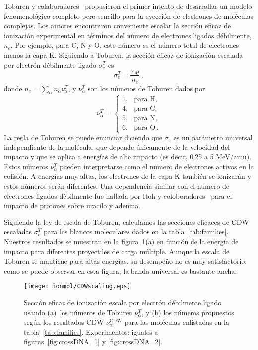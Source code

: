 Toburen y colaboradores~\cite{Toburen:75,Toburen:76} propusieron el 
primer intento de desarrollar un modelo fenomenológico completo pero 
sencillo para la eyección de electrones de moléculas complejas. Los 
autores encontraron conveniente escalar la sección eficaz de ionización 
experimental en términos del número de electrones ligados débilmente, $n_e$.
Por ejemplo, para C, N y O, este número es el número total de 
electrones menos la capa K. Siguiendo a Toburen, la sección eficaz de 
ionización escalada por electrón débilmente ligado $\sigma_{e}^T$ es
\begin{equation}
\sigma_{e}^T=\frac{\sigma_{M}}{n_e}\,, 
\label{27} 
\end{equation}
donde $n_e=\sum_{\alpha}n_{\alpha}\nu_{\alpha}^T$, y $\nu_{\alpha}^T$ 
son los números de Toburen dados por
\begin{equation}
\nu_{\alpha}^T=\left\{ 
\begin{array}{ll}
1, & \text{para H,} \\
4, & \text{para C,} \\ 
5, & \text{para N,} \\ 
6, & \text{para O}\,.
\end{array}\right.
\label{eq:nelec} 
\end{equation} 
La regla de Toburen se puede enunciar diciendo que $\sigma_{e}$ es un 
parámetro universal independiente de la molécula, que depende únicamente 
de la velocidad del impacto y que se aplica a energías de alto impacto 
(es decir, 0,25 a 5 MeV/amu). Estos números $\nu_{\alpha}^T$ pueden 
interpretarse como el número de electrones activos en la colisión. A 
energías muy altas, los electrones de la capa K también se ionizarán y 
estos números serán diferentes. Una dependencia similar con el número de 
electrones ligados débilmente fue hallada por Itoh y 
coloboradores~\cite{itoh2013} para el impacto de protones sobre uracilo 
y adenina.

Siguiendo la ley de escala de Toburen, calculamos las secciones eficaces 
de CDW escaladas $\sigma_{e}^T$ para los blancos moleculares dados en la
tabla~\ref{tab:families}. Nuestros resultados se muestran en la 
figura~\ref{fig:newscaling}(a) en función de la energía de impacto para 
diferentes proyectiles de carga múltiple. Aunque la escala de Toburen 
se mantiene para altas energías, su desempeño no es muy satisfactorio: 
como se puede observar en esta figura, la banda universal es bastante 
ancha.

\begin{figure}
\centering
\texttt{[image: ionmol/CDWscaling.eps]}
\caption[Sección eficaz de ionización escalada por $n_e$.]
{Sección eficaz de ionización escala por electrón débilmente ligado 
usando (a)~los números de Toburen $\nu_{\alpha}^T$, y (b) los
números propuestos según los resultados CDW $\nu_{\alpha}^{\text{CDW}}$ 
para las moléculas enlistadas en la tabla~\ref{tab:families}. 
Experimentos: iguales a figuras~\ref{fig:crossDNA_1} y 
\ref{fig:crossDNA_2}.}
\label{fig:newscaling}
\end{figure}

